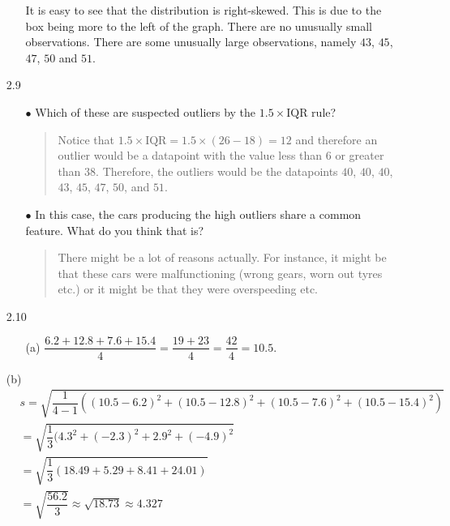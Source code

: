 \documentclass[11pt, a4paper]{article}
\begin{document}
\begin{itemize}
\begin{itemize}
It is easy to see that the distribution is right-skewed.
This is due to the box being more to the left of the graph.
There are no unusually small observations. There are
some unusually large observations, namely $43$, $45$, $47$,
$50$ and $51$.
\end{itemize}


\item[]
\item[]

\item[2.9]
\begin{itemize}
\item[$\bullet$]
Which of these are suspected outliers by the $1.5 \times \text{IQR}$ rule?
\begin{quote}
Notice that $1.5 \times \text{IQR} = 1.5 \times (26 - 18) = 12$ and therefore an outlier would be a datapoint
with the value less than $6$ or greater than $38$. Therefore, the outliers
would be the datapoints $40$, $40$, $40$, $43$, $45$, $47$, $50$, and $51$.
\end{quote}

\item[$\bullet$]
In this case, the cars producing the high outliers share a common feature.
What do you think that is?
\begin{quote}
There might be a lot of reasons actually. For instance, it might be that these
cars were malfunctioning (wrong gears, worn out tyres etc.) or it might be that
they were overspeeding etc.
\end{quote}
\end{itemize}

\item[]
\item[]

\item[2.10]
\begin{itemize}
\item[(a)]
$\dfrac{6.2 + 12.8 + 7.6 + 15.4}{4} = \dfrac{19 + 23}{4} = \dfrac{42}{4} = 10.5$.
\end{itemize}

\item[]

\item[(b)]
\begin{align*}
&s = \sqrt{\dfrac{1}{4 - 1}((10.5 - 6.2)^2 + (10.5 - 12.8)^2 + (10.5 - 7.6)^2 + (10.5 - 15.4)^2)}\\
&= \sqrt{\dfrac{1}{3}(4.3^2 + (-2.3)^2 + 2.9^2 + (-4.9)^2}\\
&= \sqrt{\dfrac{1}{3}(18.49 + 5.29 + 8.41 + 24.01)}\\
&= \sqrt{\dfrac{56.2}{3}} \approx \sqrt{18.73} \approx 4.327
\end{align*}


\end{itemize}
\end{document}

